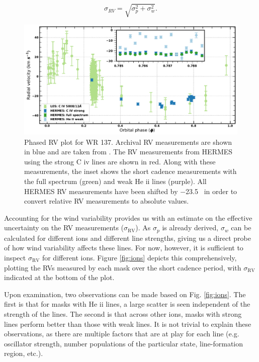 \begin{equation}\label{eq:sig_RV}
\sigma_{RV} = \sqrt{\sigma_p^2 + \sigma_w^2} \textrm{.}
\end{equation}
\begin{figure}
    \centering
    \includegraphics[width=\hsize]{chapters/WC/image/WR137_shortcadence.pdf}
    \caption{Phased RV plot for WR 137. Archival RV measurements are shown in blue and are taken from \citet{lefevre_spectroscopic_2005}. The RV measurements from HERMES using the strong C {\sc iv} lines are shown in red. Along with these measurements, the inset shows the short cadence measurements with the full spectrum (green) and weak He {\sc ii} lines (purple). All HERMES RV measurements have been shifted by $-$23.5~\kms{} in order to convert relative RV measurements to absolute values.}
    \label{fig:WR137_shortcadence}
\end{figure}
Accounting for the wind variability provides us with an estimate on the effective uncertainty on the RV measurements ($\sigma_\textrm{RV}$). As $\sigma_p$ is already derived, $\sigma_w$ can be calculated for different ions and different line strengths, giving us a direct probe of how wind variability affects these lines. For now, however, it is sufficient to inspect $\sigma_\textrm{RV}$ for different ions. Figure \ref{fig:ions} depicts this comprehensively, plotting the RVs measured by each mask over the short cadence period, with $\sigma_\textrm{RV}$ indicated at the bottom of the plot.

Upon examination, two observations can be made based on Fig. \ref{fig:ions}. The first is that for masks with He {\sc ii} lines, a large scatter is seen independent of the strength of the lines. The second is that across other ions, masks with strong lines perform better than those with weak lines. It is not trivial to explain these observations, as there are multiple factors that are at play for each line (e.g. oscillator strength, number populations of the particular state, line-formation region, etc.).

